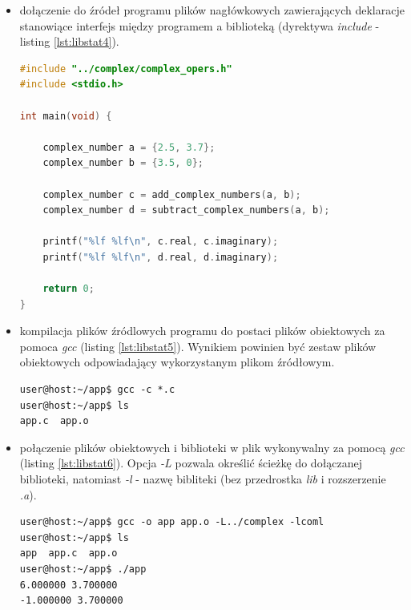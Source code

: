 \begin{itemize}
\item dołączenie do źródeł programu plików nagłówkowych zawierających deklaracje stanowiące interfejs między programem a biblioteką (dyrektywa \textit{include} - listing \ref{lst:libstat4}).

\begin{lstlisting}[language=c++, caption={Plik \textit{app.c} zawierający dyrektywę \textit{include} dołączającą plik nagłówkowy zawierający deklaracje funkcji z biblioteki statycznej},label={lst:libstat4}]
#include "../complex/complex_opers.h"
#include <stdio.h>

int main(void) {

    complex_number a = {2.5, 3.7};
    complex_number b = {3.5, 0};

    complex_number c = add_complex_numbers(a, b);
    complex_number d = subtract_complex_numbers(a, b);

    printf("%lf %lf\n", c.real, c.imaginary);
    printf("%lf %lf\n", d.real, d.imaginary);

    return 0;
}
\end{lstlisting}

\item kompilacja plików źródlowych programu do postaci plików obiektowych za pomoca \textit{gcc} (listing \ref{lst:libstat5}). Wynikiem powinien być zestaw plików obiektowych odpowiadający wykorzystanym plikom źródłowym.

\begin{lstlisting}[style=Cmd, caption={Kompilacja plików źródłowych głównego programu do postaci obiektowej.},label={lst:libstat5}]
user@host:~/app$ gcc -c *.c
user@host:~/app$ ls
app.c  app.o
\end{lstlisting}


\item połączenie plików obiektowych i biblioteki w plik wykonywalny za pomocą \textit{gcc} (listing \ref{lst:libstat6}). Opcja \textit{-L} pozwala określić ścieżkę do dołączanej biblioteki, natomiast \textit{-l} - nazwę bibliteki (bez przedrostka \textit{lib} i rozszerzenie \textit{.a}).

\begin{lstlisting}[style=Cmd, caption={Linkowanie plików obiektowych programu z biblioteką statyczną, wynik uruchomienia programu obrazuący poprawne działanie przykładu.},label={lst:libstat6}]
user@host:~/app$ gcc -o app app.o -L../complex -lcoml
user@host:~/app$ ls
app  app.c  app.o
user@host:~/app$ ./app
6.000000 3.700000
-1.000000 3.700000
\end{lstlisting}

\end{itemize}


